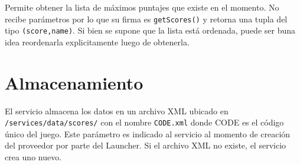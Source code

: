 \documentclass[language=spanish]{article}
\begin{document}
Permite obtener la lista de máximos puntajes que existe en el momento. No recibe parámetros por lo que su firma es {\tt getScores()} y retorna una tupla del tipo {\tt (score,name)}. Si bien se supone que la lista está ordenada, puede ser buna idea reordenarla explicitamente luego de obtenerla.

\section{Almacenamiento}

El servicio almacena los datos en un archivo XML ubicado en {\tt /services/data/scores/} con el nombre {\tt CODE.xml} donde CODE es el código único del juego. Este parámetro es indicado al servicio al momento de creación del proveedor por parte del Launcher. Si el archivo XML no existe, el servicio crea uno nuevo. 
\end{document}
